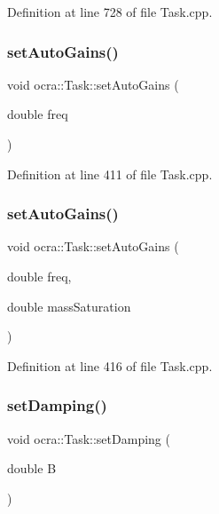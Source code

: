 Definition at line 728 of file Task.\+cpp.

\hypertarget{classocra_1_1Task_a6d2b2b67112b1368c8bfd7e0ee8e2a0b}{}\label{classocra_1_1Task_a6d2b2b67112b1368c8bfd7e0ee8e2a0b} 
\subsubsection{\texorpdfstring{set\+Auto\+Gains()}{setAutoGains()}\hspace{0.1cm}{\footnotesize\ttfamily [1/2]}}
{\footnotesize\ttfamily void ocra\+::\+Task\+::set\+Auto\+Gains (\begin{DoxyParamCaption}\item[{double}]{freq }\end{DoxyParamCaption})}



Definition at line 411 of file Task.\+cpp.

\hypertarget{classocra_1_1Task_a310fb246ea58d09d51af965a96d6a628}{}\label{classocra_1_1Task_a310fb246ea58d09d51af965a96d6a628} 
\subsubsection{\texorpdfstring{set\+Auto\+Gains()}{setAutoGains()}\hspace{0.1cm}{\footnotesize\ttfamily [2/2]}}
{\footnotesize\ttfamily void ocra\+::\+Task\+::set\+Auto\+Gains (\begin{DoxyParamCaption}\item[{double}]{freq,  }\item[{double}]{mass\+Saturation }\end{DoxyParamCaption})}



Definition at line 416 of file Task.\+cpp.

\hypertarget{classocra_1_1Task_a51509c15751c0fc8c40bf4b2328d7b21}{}\label{classocra_1_1Task_a51509c15751c0fc8c40bf4b2328d7b21} 
\subsubsection{\texorpdfstring{set\+Damping()}{setDamping()}\hspace{0.1cm}{\footnotesize\ttfamily [1/3]}}
{\footnotesize\ttfamily void ocra\+::\+Task\+::set\+Damping (\begin{DoxyParamCaption}\item[{double}]{B }\end{DoxyParamCaption})}



